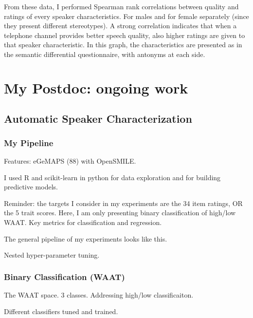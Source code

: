 \documentclass[a4paper]{article}
\begin{document}
From these data, I performed Spearman rank correlations between quality and ratings of every speaker characteristics. For males and for female separately (since they present different stereotypes). A strong correlation indicates that when a telephone channel provides better speech quality, also higher ratings are given to that speaker characteristic. In this graph, the characteristics are presented as in the semantic differential questionnaire, with antonyms at each side.




\section{My Postdoc: ongoing work}

\subsection{Automatic Speaker Characterization}


\subsubsection{My Pipeline}

Features: eGeMAPS (88) with OpenSMILE.

I used R and scikit-learn in python for data exploration and for building predictive models.

Reminder: the targets I consider in my experiments are the 34 item ratings, OR the 5 trait scores. 
Here, I am only presenting binary classification of high/low WAAT.
Key metrics for classification and regression.

The general pipeline of my experiments looks like this. 

Nested hyper-parameter tuning.


\subsubsection{Binary Classification (WAAT)}

The WAAT space. 3 classes. Addressing high/low classificaiton.

Different classifiers tuned and trained.
\end{document}
